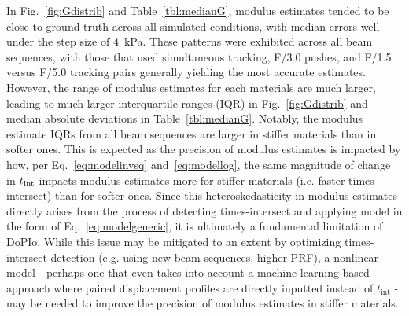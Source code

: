 In Fig.~\ref{fig:Gdistrib} and Table~\ref{tbl:medianG}, modulus estimates tended to be close to ground truth across all simulated conditions, with median errors well under the step size of 4~kPa. These patterns were exhibited across all beam sequences, with those that used simultaneous tracking, F/3.0 pushes, and F/1.5 versus F/5.0 tracking pairs generally yielding the most accurate estimates. However, the range of modulus estimates for each materials are much larger, leading to much larger interquartile ranges (IQR) in Fig.~\ref{fig:Gdistrib} and median absolute deviations in Table~\ref{tbl:medianG}. Notably, the modulus estimate IQRs from all beam sequences are larger in stiffer materials than in softer ones. This is expected as the precision of modulus estimates is impacted by how, per Eq.~\ref{eq:modelinvsq} and~\ref{eq:modellog}, the same magnitude of change in $t_{\textnormal{int}}$ impacts modulus estimates more for stiffer materials (i.e. faster times-intersect) than for softer ones. Since this heteroskedasticity in modulus estimates directly arises from the process of detecting times-intersect and applying model in the form of Eq.~\ref{eq:modelgeneric}, it is ultimately a fundamental limitation of DoPIo. While this issue may be mitigated to an extent by optimizing times-intersect detection (e.g. using new beam sequences, higher PRF), a nonlinear model - perhaps one that even takes into account a machine learning-based approach where paired displacement profiles are directly inputted instead of $t_{\mathrm{int}}$ - may be needed to improve the precision of modulus estimates in stiffer materials.

%

